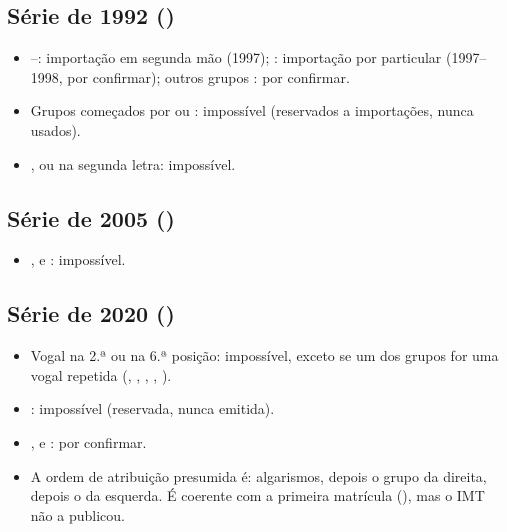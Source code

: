 \subsection{Série de 1992 ()}
\begin{itemize}
  \item {}–: importação em segunda mão (1997);
        : importação por particular (1997–1998, por confirmar);
        outros grupos : por confirmar.
  \item Grupos começados por  ou : impossível (reservados a
        importações, nunca usados).
  \item {},  ou  na segunda letra: impossível.
\end{itemize}

\subsection{Série de 2005 ()}
\begin{itemize}
  \item {},  e : impossível.
\end{itemize}

\subsection{Série de 2020 ()}
\begin{itemize}
  \item Vogal na 2.ª ou na 6.ª posição: impossível, exceto se um dos grupos for
        uma vogal repetida (, , , ,
        ).
  \item {}: impossível (reservada, nunca emitida).
  \item {},  e : por confirmar.
  \item A ordem de atribuição presumida é: algarismos, depois o grupo da direita,
        depois o da esquerda. É coerente com a primeira matrícula
        (), mas o IMT não a publicou.
\end{itemize}

